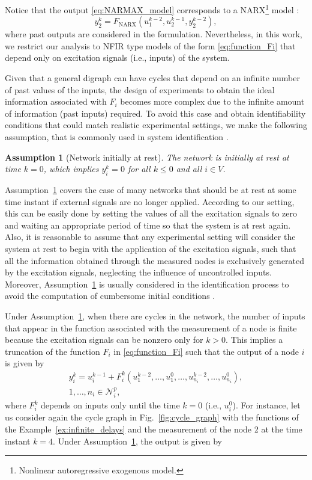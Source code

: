 \documentclass[letterpaper,10pt,journal]{IEEEtran}
\newtheorem{assumption}{Assumption}
\begin{document}
    Notice that the output \eqref{eq:NARMAX_model} corresponds to a NARX\footnote{Nonlinear autoregressive exogenous model.} \linebreak model \cite{nelles2020nonlinear}:
    $$
    y_2^k=F_{\mathrm{NARX}}(u_1^{k-2},u_2^{k-1},y_2^{k-2}),
    $$
    where past outputs are considered in the formulation.
    Nevertheless, in this work, we restrict our analysis to NFIR type models of the form \eqref{eq:function_Fi} that depend only on excitation signals (i.e., inputs) of the system.


Given that a general digraph can have cycles that depend on an infinite number of past values of the inputs, the design of experiments to obtain the ideal information associated with $F_i$ becomes more complex due to the infinite amount of information (past inputs) required.
To avoid this case and obtain identifiability conditions that could match realistic experimental settings, we make the following assumption, that is commonly used in system identification \cite{malti2006tutorial,khosravi2023kernel,pillonetto2023full,nelles2020nonlinear}.

\begin{assumption}[Network initially at rest]\label{ass:finite_variables}
The network is initially at rest at time $k=0$, which implies $y_i^k=0$ for all $k\le 0$  and all $i\in V$.
\end{assumption}
 Assumption~\ref{ass:finite_variables} covers the case of many networks that should be at rest at some time instant if external signals are no longer applied. According to our setting, this can be easily done by setting the values of all the excitation signals to zero and waiting an appropriate period of time so that the system is at rest again. Also, it is reasonable to assume that any experimental setting will consider the system at rest to begin with the application of the excitation signals, such that all the information obtained through the measured nodes is exclusively generated by the excitation signals, neglecting the influence of uncontrolled inputs. Moreover, Assumption~\ref{ass:finite_variables} is usually considered in the identification process to avoid the computation of cumbersome initial conditions \cite{campi2002finite}.


Under Assumption~\ref{ass:finite_variables}, when there are cycles in the network, the number of inputs that appear in the function associated with the measurement of a node is finite because the excitation signals can be nonzero only for $k>0$. This implies a truncation of the function $F_i$ in \eqref{eq:function_Fi} such that the output of a node $i$ is given by
\begin{multline}\label{eq:function_Fi_cycles}
    y_i^k=u_i^{k-1}+F_i^k(u_1^{k-2},\ldots,u_1^{0},\ldots,u_{n_i}^{k-2},\ldots,u_{n_i}^{0}),\\
    1,\dots,n_i\in \mathcal{N}_i^p,
\end{multline}
where $F_i^k$ depends on inputs only until the time $k=0$ (i.e., $u_i^0$). 
For instance, let us consider again the cycle graph in Fig.~\ref{fig:cycle_graph} with the functions of the Example~\ref{ex:infinite_delays} and the measurement of the node 2 at the time instant $k=4$. Under Assumption~\ref{ass:finite_variables}, the output is given by
\end{document}

